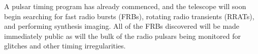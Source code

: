 A pulsar timing program has already commenced, and the telescope will soon begin searching for fast radio bursts (FRBs), rotating radio transients (RRATs), and performing synthesis imaging. All of the FRBs discovered will be made immediately public as will the bulk of the radio pulsars being monitored for glitches and other timing irregularities. 